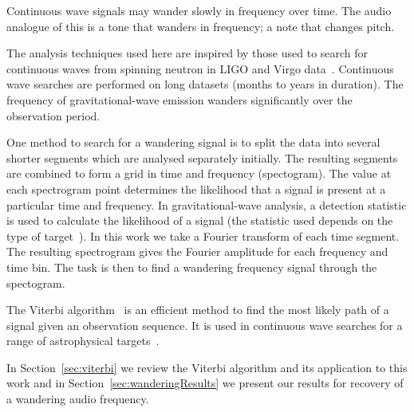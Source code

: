 \documentclass[paper-main.tex]{subfiles}
\begin{document}
 
Continuous wave signals may wander slowly in frequency over time. 
The audio analogue of this is a tone that wanders in frequency; a note that changes pitch. 


The analysis techniques used here are inspired by those used to search for continuous waves from spinning neutron in LIGO and Virgo data~\cite{SuvorovaEtAl:2016,SuvorovaEtAl:2017}.
Continuous wave searches are performed on long datasets (months to years in duration). 
The frequency of gravitational-wave emission wanders significantly over the observation period. 

One method to search for a wandering signal is to split the data into several shorter segments which are analysed separately initially. 
The resulting segments are combined to form a grid in time and frequency (spectogram). 
The value at each spectrogram point determines the likelihood that a signal is present at a particular time and frequency. 
In gravitational-wave analysis, a detection statistic is used to calculate the likelihood of a signal (the statistic used depends on the type of target~\cite{JKS:1998,SuvorovaEtAl:2017}). 
In this work we take a Fourier transform of each time segment.
The resulting spectrogram gives the Fourier amplitude for each frequency and time bin. 
The task is then to find a wandering frequency signal through the spectogram. 

The Viterbi algorithm~\cite{Viterbi:1967} is an efficient method to find the most likely path of a signal given an observation sequence. 
It is used in continuous wave searches for a range of astrophysical targets~\cite{ScoX1O2Viterbi:2019,ScoX1ViterbiO1:2017,MillhouseStrangMelatos:2020,PostMergerRemnantSearch:2019,SunEtAlSNR:2018,viterbi_application}. 
 
In Section~\ref{sec:viterbi} we review the Viterbi algorithm and its application to this work and in Section~\ref{sec:wanderingResults} we present our results for recovery of a wandering audio frequency. 
\end{document}
